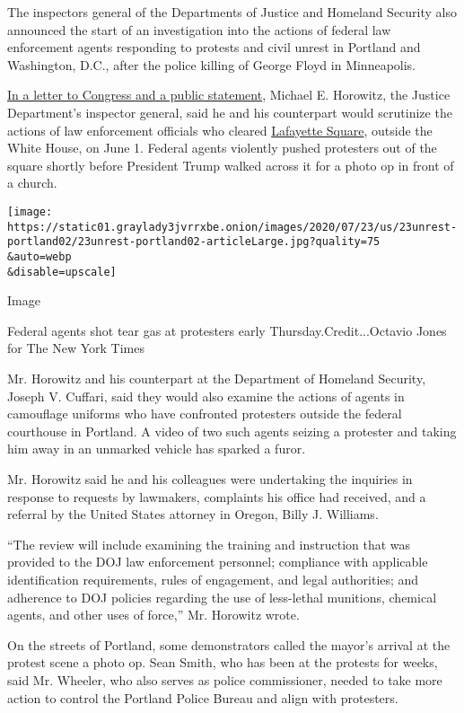 The inspectors general of the Departments of Justice and Homeland
Security also announced the start of an investigation into the actions
of federal law enforcement agents responding to protests and civil
unrest in Portland and Washington, D.C., after the police killing of
George Floyd in Minneapolis.

\href{https://twitter.com/DanielStrauss4/status/1286375148115963904}{In
a letter to Congress and a public statement}, Michael E. Horowitz, the
Justice Department's inspector general, said he and his counterpart
would scrutinize the actions of law enforcement officials who cleared
\href{https://www.nytimes3xbfgragh.onion/2020/07/28/us/politics/lafayette-square-park-police-protests.html}{Lafayette
Square}, outside the White House, on June 1. Federal agents violently
pushed protesters out of the square shortly before President Trump
walked across it for a photo op in front of a church.

\texttt{[image: https://static01.graylady3jvrrxbe.onion/images/2020/07/23/us/23unrest-portland02/23unrest-portland02-articleLarge.jpg?quality=75\\\&auto=webp\\\&disable=upscale]}

Image

Federal agents shot tear gas at protesters early
Thursday.Credit...Octavio Jones for The New York Times

Mr. Horowitz and his counterpart at the Department of Homeland Security,
Joseph V. Cuffari, said they would also examine the actions of agents in
camouflage uniforms who have confronted protesters outside the federal
courthouse in Portland. A video of two such agents seizing a protester
and taking him away in an unmarked vehicle has sparked a furor.

Mr. Horowitz said he and his colleagues were undertaking the inquiries
in response to requests by lawmakers, complaints his office had
received, and a referral by the United States attorney in Oregon, Billy
J. Williams.

``The review will include examining the training and instruction that
was provided to the DOJ law enforcement personnel; compliance with
applicable identification requirements, rules of engagement, and legal
authorities; and adherence to DOJ policies regarding the use of
less-lethal munitions, chemical agents, and other uses of force,'' Mr.
Horowitz wrote.

On the streets of Portland, some demonstrators called the mayor's
arrival at the protest scene a photo op. Sean Smith, who has been at the
protests for weeks, said Mr. Wheeler, who also serves as police
commissioner, needed to take more action to control the Portland Police
Bureau and align with protesters.

